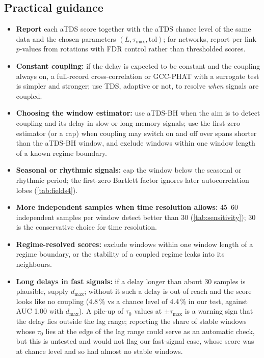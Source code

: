\documentclass[11pt,a4paper]{article}
\begin{document}
\subsection*{Practical guidance}
\label{sec:guidance}
\begin{itemize}
\item \textbf{Report} each aTDS score together with the aTDS chance level of the same data and the chosen parameters $(L, \tau_{\max}, \mathrm{tol})$; for networks, report per-link $p$-values from rotations with FDR control rather than thresholded scores.
\item \textbf{Constant coupling:} if the delay is expected to be constant and the coupling always on, a full-record cross-correlation or GCC-PHAT with a surrogate test is simpler and stronger; use TDS, adaptive or not, to resolve \emph{when} signals are coupled.
\item \textbf{Choosing the window estimator:} use aTDS-BH when the aim is to detect coupling and its delay in slow or long-memory signals; use the first-zero estimator (or a cap) when coupling may switch on and off over spans shorter than the aTDS-BH window, and exclude windows within one window length of a known regime boundary.
\item \textbf{Seasonal or rhythmic signals:} cap the window below the seasonal or rhythmic period; the first-zero Bartlett factor ignores later autocorrelation lobes (\cref{tab:fields4}).
\item \textbf{More independent samples when time resolution allows:} 45--60 independent samples per window detect better than 30 (\cref{tab:sensitivity}); 30 is the conservative choice for time resolution.
\item \textbf{Regime-resolved scores:} exclude windows within one window length of a regime boundary, or the stability of a coupled regime leaks into its neighbours.
\item \textbf{Long delays in fast signals:} if a delay longer than about 30 samples is plausible, supply $d_{\max}$; without it such a delay is out of reach and the score looks like no coupling (4.8\,\% vs a chance level of 4.4\,\% in our test, against AUC 1.00 with $d_{\max}$). A pile-up of $\tau_0$ values at $\pm\tau_{\max}$ is a warning sign that the delay lies outside the lag range; reporting the share of stable windows whose $\tau_0$ lies at the edge of the lag range could serve as an automatic check, but this is untested and would not flag our fast-signal case, whose score was at chance level and so had almost no stable windows.

\end{itemize}
\end{document}
